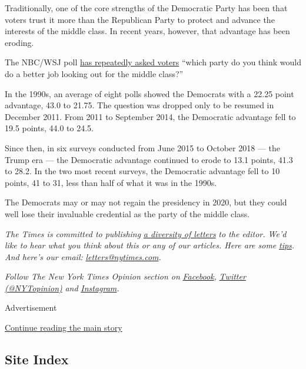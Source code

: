 Traditionally, one of the core strengths of the Democratic Party has
been that voters trust it more than the Republican Party to protect and
advance the interests of the middle class. In recent years, however,
that advantage has been eroding.

The NBC/WSJ poll
\href{http://wsj.com/public/resources/documents/181259NBCWSJOctober2018PollFinal.pdf?mod=article_inline\&mod=article_inline}{has
repeatedly asked voters} ``which party do you think would do a better
job looking out for the middle class?''

In the 1990s, an average of eight polls showed the Democrats with a
22.25 point advantage, 43.0 to 21.75. The question was dropped only to
be resumed in December 2011. From 2011 to September 2014, the Democratic
advantage fell to 19.5 points, 44.0 to 24.5.

Since then, in six surveys conducted from June 2015 to October 2018 ---
the Trump era --- the Democratic advantage continued to erode to 13.1
points, 41.3 to 28.2. In the two most recent surveys, the Democratic
advantage fell to 10 points, 41 to 31, less than half of what it was in
the 1990s.

The Democrats may or may not regain the presidency in 2020, but they
could well lose their invaluable credential as the party of the middle
class.

\emph{The Times is committed to publishing}
\href{https://www.nytimes.com/2019/01/31/opinion/letters/letters-to-editor-new-york-times-women.html}{\emph{a
diversity of letters}} \emph{to the editor. We'd like to hear what you
think about this or any of our articles. Here are some}
\href{https://help.nytimes.com/hc/en-us/articles/115014925288-How-to-submit-a-letter-to-the-editor}{\emph{tips}}\emph{.
And here's our email:}
\href{mailto:letters@nytimes.com}{\emph{letters@nytimes.com}}\emph{.}

\emph{Follow The New York Times Opinion section on}
\href{https://www.facebook.com/nytopinion}{\emph{Facebook}}\emph{,}
\href{http://twitter.com/NYTOpinion}{\emph{Twitter (@NYTopinion)}}
\emph{and}
\href{https://www.instagram.com/nytopinion/}{\emph{Instagram}}\emph{.}

Advertisement

\protect\hyperlink{after-bottom}{Continue reading the main story}

\hypertarget{site-index}{%
\subsection{Site Index}\label{site-index}}

